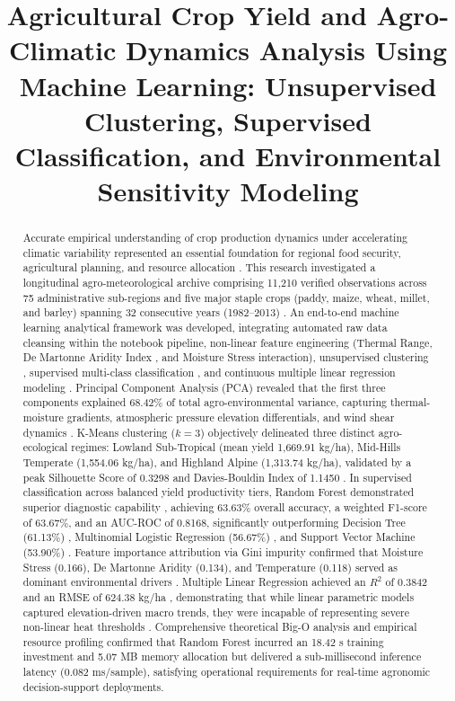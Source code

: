 \documentclass[conference]{IEEEtran}
\title{Agricultural Crop Yield and Agro-Climatic Dynamics Analysis Using Machine Learning: Unsupervised Clustering, Supervised Classification, and Environmental Sensitivity Modeling}
\author{
\IEEEauthorblockN{Sukriti Sapkota}
\IEEEauthorblockA{
MSc Data Science and Computational Intelligence\\
Softwarica College of IT and E-Commerce, Coventry University\\
Student ID: 260180 \quad Module: STW7072CEM Machine Learning\\
Email: 260180@softwarica.edu.np
}
}
\begin{document}
\maketitle

\begin{abstract}
Accurate empirical understanding of crop production dynamics under accelerating climatic variability represented an essential foundation for regional food security, agricultural planning, and resource allocation \cite{dhakal2023, crane2018}. This research investigated a longitudinal agro-meteorological archive comprising 11,210 verified observations across 75 administrative sub-regions and five major staple crops (paddy, maize, wheat, millet, and barley) spanning 32 consecutive years (1982--2013) \cite{dhakal2023, fernandez2021}. An end-to-end machine learning analytical framework was developed, integrating automated raw data cleansing within the notebook pipeline, non-linear feature engineering (Thermal Range, De Martonne Aridity Index \cite{demartonne1926}, and Moisture Stress interaction), unsupervised clustering \cite{macqueen1967, hotelling1933}, supervised multi-class classification \cite{breiman2001, cortes1995, quinlan1986}, and continuous multiple linear regression modeling \cite{hastie2009, hoerl1970}. Principal Component Analysis (PCA) revealed that the first three components explained 68.42\% of total agro-environmental variance, capturing thermal-moisture gradients, atmospheric pressure elevation differentials, and wind shear dynamics \cite{hotelling1933}. K-Means clustering ($k=3$) objectively delineated three distinct agro-ecological regimes: Lowland Sub-Tropical (mean yield 1,669.91 kg/ha), Mid-Hills Temperate (1,554.06 kg/ha), and Highland Alpine (1,313.74 kg/ha), validated by a peak Silhouette Score of 0.3298 \cite{rousseeuw1987} and Davies-Bouldin Index of 1.1450 \cite{davies1979}. In supervised classification across balanced yield productivity tiers, Random Forest demonstrated superior diagnostic capability \cite{breiman2001}, achieving 63.63\% overall accuracy, a weighted F1-score of 63.67\%, and an AUC-ROC of 0.8168, significantly outperforming Decision Tree (61.13\%) \cite{quinlan1986}, Multinomial Logistic Regression (56.67\%) \cite{hastie2009}, and Support Vector Machine (53.90\%) \cite{cortes1995}. Feature importance attribution via Gini impurity confirmed that Moisture Stress (0.166), De Martonne Aridity (0.134), and Temperature (0.118) served as dominant environmental drivers \cite{lobell2008, schlenker2009}. Multiple Linear Regression achieved an $R^2$ of 0.3842 and an RMSE of 624.38 kg/ha \cite{hoerl1970}, demonstrating that while linear parametric models captured elevation-driven macro trends, they were incapable of representing severe non-linear heat thresholds \cite{crane2018, schlenker2009}. Comprehensive theoretical Big-O analysis and empirical resource profiling confirmed that Random Forest incurred an 18.42 s training investment and 5.07 MB memory allocation but delivered a sub-millisecond inference latency (0.082 ms/sample), satisfying operational requirements for real-time agronomic decision-support deployments.
\end{abstract}
\end{document}
